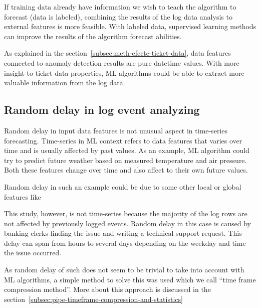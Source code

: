 If training data already have information
we wish to teach the algorithm to forecast (\ie data is labeled),
combining the results of the log data analysis to external features
is more feasible.
With labeled data,
supervised learning methods can improve the results of the algorithm forecast abilities.
~\cite{rantala2019applying}

As explained in the section~\ref{subsec:meth-efecte-ticket-data},
data features connected to anomaly detection results
are pure datetime values.
With more insight to ticket data properties,
ML algorithms could be able to extract more valuable information
from the log data.


\subsection{Random delay in log event analyzing}\label{subsec:bg-random-delay}

Random delay in input data features
is not unusual aspect in time-series forecasting.
Time-series in ML context
refers to data features that varies over time
and is usually affected by past values.
As an example,
ML algorithm could try to predict future weather
based on measured temperature and air pressure.
Both these features change over time
and also affect to their own future values.

Random delay in such an example
could be due to some other local or global features
like

This study, however,
is not time-series
because the majority of the log rows
are not affected by previously logged events.
Random delay in this case
is caused by banking clerks
finding the issue and writing a technical support request.
This delay can span from hours to several days
depending on the weekday and time the issue occurred.


As random delay of such
does not seem to be trivial to take into account
with ML algorithms, %
a simple method to solve this was used
which we call \enquote{time frame compression method}.
More about this approach is discussed in the section~\ref{subsec:pipe-timeframe-compression-and-statistics}

